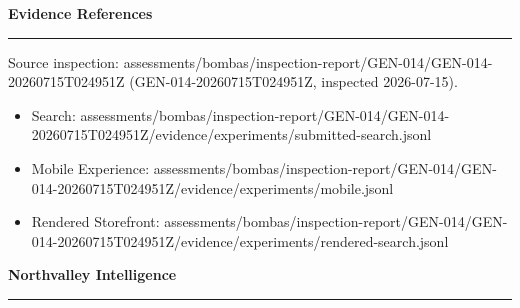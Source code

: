 \documentclass[10pt]{article}
\newcommand{\ReportSection}[1]{%
  \vspace{0.12in}
  {\fontsize{15}{18}\selectfont\bfseries\color{NVIInk}#1}\\[-0.02in]
  {\color{NVIAccent}\rule{\linewidth}{0.8pt}}
  \vspace{0.07in}
}
\newcommand{\ReportFine}[1]{{\fontsize{7.6}{9.1}\selectfont\color{NVIMuted}#1}}
\begin{document}
\vspace{0.14in}
\ReportSection{Evidence References}
\ReportFine{Source inspection: assessments/bombas/inspection-report/GEN-014/GEN-014-20260715T024951Z (GEN-014-20260715T024951Z, inspected 2026-07-15).}\par
\begin{itemize}
\item \ReportFine{Search: assessments/bombas/inspection-report/GEN-014/GEN-014-20260715T024951Z/evidence/experiments/submitted-search.jsonl}
\item \ReportFine{Mobile Experience: assessments/bombas/inspection-report/GEN-014/GEN-014-20260715T024951Z/evidence/experiments/mobile.jsonl}
\item \ReportFine{Rendered Storefront: assessments/bombas/inspection-report/GEN-014/GEN-014-20260715T024951Z/evidence/experiments/rendered-search.jsonl}
\end{itemize}
\vfill
\begin{center}
{\fontsize{16}{19}\selectfont\bfseries\color{NVIInk}Northvalley Intelligence}\\[0.06in]
{\color{NVIAccent}\rule{2.2in}{0.8pt}}\\[0.08in]
\ReportFine{\NorthvalleyContactLine}
\end{center}
\end{document}
